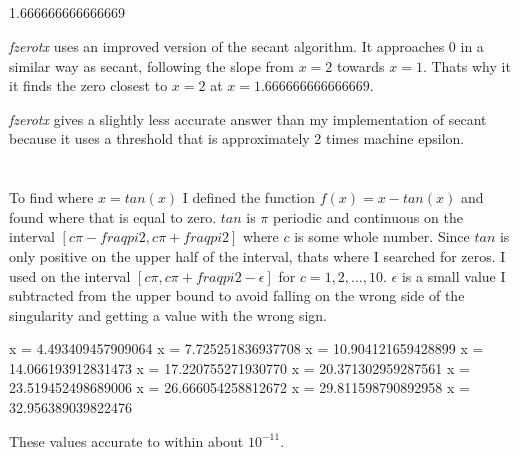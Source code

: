 \documentclass[12pt]{article}
\begin{document}
\subsection{}

1.666666666666669

\textit{fzerotx} uses an improved version of the secant algorithm. It approaches 0 in a similar way as secant, following the slope from $x=2$ towards $x=1$. Thats why it it finds the zero closest to $x=2$ at $x=1.666666666666669$.

\textit{fzerotx} gives a slightly less accurate answer than my implementation of secant because it uses a threshold that is approximately 2 times machine epsilon.

\section{}

To find where $x = tan(x)$ I defined the function $f(x) = x-tan(x)$ and found where that is equal to zero. $tan$ is $\pi$ periodic and continuous on the interval $[c\pi - fraq{pi}{2}, c\pi + fraq{pi}{2}]$ where $c$ is some whole number. Since $tan$ is only positive on the upper half of the interval, thats where I searched for zeros. I used  on the interval 
$[c\pi, c\pi + fraq{pi}{2} - \epsilon]$ for $c = 1,2, \dots,10$. $\epsilon$ is a small value I subtracted from the upper bound to avoid falling on the wrong side of the singularity and getting a value with the wrong sign.

x = 4.493409457909064
x = 7.725251836937708
x = 10.904121659428899
x = 14.066193912831473
x = 17.220755271930770
x = 20.371302959287561
x = 23.519452498689006
x = 26.666054258812672
x = 29.811598790892958
x = 32.956389039822476

These values accurate to within about $10^{-11}$.

\end{document}

